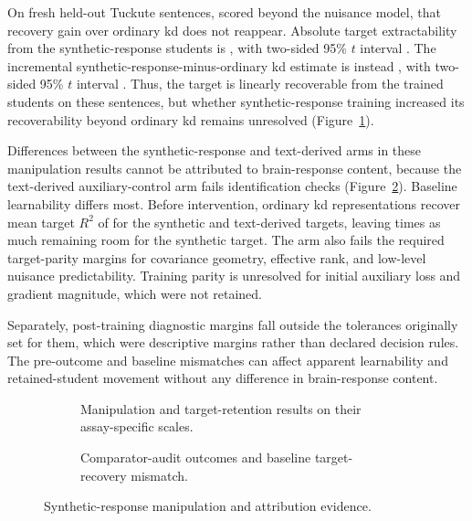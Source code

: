 On fresh held-out Tuckute sentences, scored beyond the nuisance model, that recovery gain over ordinary \ac{kd} does not reappear.
Absolute target extractability from the synthetic-response students is , with two-sided 95\% \(t\) interval .
The incremental synthetic-response-minus-ordinary \ac{kd} estimate is instead , with two-sided 95\% \(t\) interval .
Thus, the target is linearly recoverable from the trained students on these sentences, but whether synthetic-response training increased its recoverability beyond ordinary \ac{kd} remains unresolved (Figure~\ref{fig:synthetic-manipulation-results}). 

Differences between the synthetic-response and text-derived arms in these manipulation results cannot be attributed to brain-response content, because the text-derived auxiliary-control arm fails  identification checks (Figure~\ref{fig:synthetic-comparator-audit}).
Baseline learnability differs most.
Before intervention, ordinary \ac{kd} representations recover mean target \(R^2\) of  for the synthetic and text-derived targets, leaving  times as much remaining room for the synthetic target.
The arm also fails the required target-parity margins for covariance geometry, effective rank, and low-level nuisance predictability.
Training parity is unresolved for initial auxiliary loss and gradient magnitude, which were not retained.

Separately,  post-training diagnostic margins fall outside the tolerances originally set for them, which were descriptive margins rather than declared decision rules.
The pre-outcome and baseline mismatches can affect apparent learnability and retained-student movement without any difference in brain-response content. 

\begin{figure}[tbp]
  \centering
  \begin{subfigure}[t]{\textwidth}
    \centering
    \resizebox{\linewidth}{!}{}
    \par\smallskip
    \caption{Manipulation and target-retention results on their assay-specific scales.}
    \label{fig:synthetic-manipulation-results}
  \end{subfigure}
  \par\smallskip
  \begin{subfigure}[t]{\textwidth}
    \centering
    \resizebox{\linewidth}{!}{}
    \par\smallskip
    \caption{Comparator-audit outcomes and baseline target-recovery mismatch.}
    \label{fig:synthetic-comparator-audit}
  \end{subfigure}
  \caption{Synthetic-response manipulation and attribution evidence.}
  \label{fig:synthetic-manipulation-attribution}
\end{figure}

